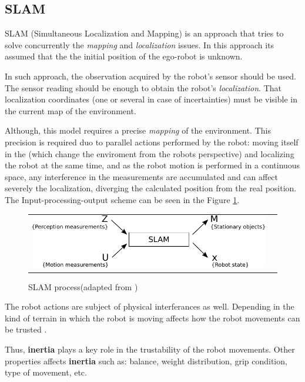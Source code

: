 \subsection{SLAM}

SLAM (Simultaneous Localization and Mapping) is an approach that tries to solve concurrently the \textit{mapping} and \textit{localization} issues\cite{VU-2009-454238}. In this approach its assumed that the the initial position of the ego-robot is unknown. 

In such approach,  the observation acquired by the robot's sensor should be used. The sensor reading should be enough to obtain the robot's \textit{localization}. That localization coordinates (one or several in case of incertainties) must be visible in the current map of the environment. 

Although, this model requires a precise \textit{mapping} of the environment. This precision is required duo to parallel actions performed by the robot: moving itself in the (which change the enviroment from the robots perspective) and localizing the robot at the same time, and as the robot motion is performed in a continuous space, any interference in the measurements are accumulated and can affect severely the localization, diverging the calculated position from the real position. The Input-processing-output scheme can be seen in the Figure \ref{fig:perception:slam}.

\begin{figure}[h]
   \centering
     \begin{tabular}{lr}
       \includegraphics[scale=0.9]{img/fig:perception:slam}
     \end{tabular}
   \caption{SLAM process(adapted from \cite{Wang04a})}
   \label{fig:perception:slam}
\end{figure}

The robot actions are subject of physical interferances as well. Depending in the kind of terrain in which the robot is moving affects how the robot movements can be trusted \cite{DBLP:conf/icra/LenainTHM11}. 

Thus, \textbf{inertia} plays a key role in the trustability of the robot movements. Other properties affects \textbf{inertia} such as: balance, weight distribution, grip condition, type of movement, etc.

